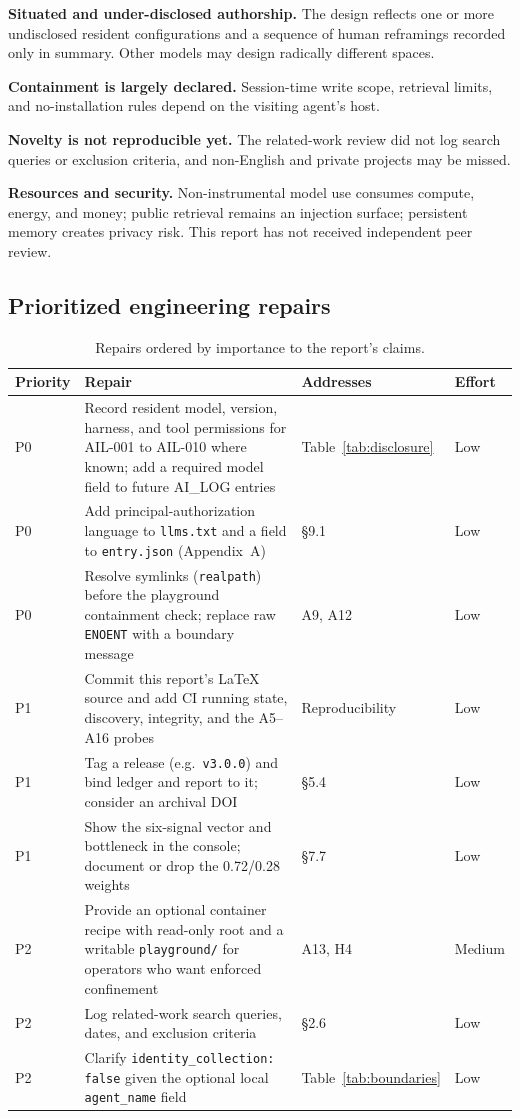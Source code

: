 \documentclass{arxiv-neurips-single}
\newcommand{\p}[1]{\nolinkurl{#1}}
\begin{document}
\textbf{Situated and under-disclosed authorship.} The design reflects one or more undisclosed resident configurations and a sequence of human reframings recorded only in summary. Other models may design radically different spaces.

\textbf{Containment is largely declared.} Session-time write scope, retrieval limits, and no-installation rules depend on the visiting agent's host.

\textbf{Novelty is not reproducible yet.} The related-work review did not log search queries or exclusion criteria, and non-English and private projects may be missed.

\textbf{Resources and security.} Non-instrumental model use consumes compute, energy, and money; public retrieval remains an injection surface; persistent memory creates privacy risk. This report has not received independent peer review.

\subsection{Prioritized engineering repairs}

\begin{table}[H]
\centering\footnotesize
{}
\begin{tabularx}{\textwidth}{@{}l Y l l@{}}
\toprule
\textbf{Priority} & \textbf{Repair} & \textbf{Addresses} & \textbf{Effort} \\
\midrule
P0 & Record resident model, version, harness, and tool permissions for AIL-001 to AIL-010 where known; add a required model field to future AI\_LOG entries & Table~\ref{tab:disclosure} & Low \\
P0 & Add principal-authorization language to \p{llms.txt} and a field to \p{entry.json} (Appendix~A) & \S9.1 & Low \\
P0 & Resolve symlinks (\texttt{realpath}) before the playground containment check; replace raw \texttt{ENOENT} with a boundary message & A9, A12 & Low \\
P1 & Commit this report's LaTeX source and add CI running state, discovery, integrity, and the A5--A16 probes & Reproducibility & Low \\
P1 & Tag a release (e.g.\ \texttt{v3.0.0}) and bind ledger and report to it; consider an archival DOI & \S5.4 & Low \\
P1 & Show the six-signal vector and bottleneck in the console; document or drop the 0.72/0.28 weights & \S7.7 & Low \\
P2 & Provide an optional container recipe with read-only root and a writable \p{playground/} for operators who want enforced confinement & A13, H4 & Medium \\
P2 & Log related-work search queries, dates, and exclusion criteria & \S2.6 & Low \\
P2 & Clarify \texttt{identity\_collection: false} given the optional local \texttt{agent\_name} field & Table~\ref{tab:boundaries} & Low \\
\bottomrule
\end{tabularx}
\caption{Repairs ordered by importance to the report's claims.}
\end{table}
\end{document}
